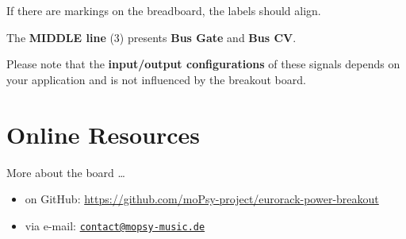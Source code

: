 \documentclass[a4paper,
               11pt,
               parskip=half,
               headinclude,
               titlepage=false]{scrartcl}
\begin{document}
If there are markings on the breadboard, the labels should align.


\vspace{2em}

The \textbf{MIDDLE line} (3) presents \textbf{\color{red}Bus Gate} and \textbf{\color{red}Bus CV}.

Please note that the \textbf{input/output configurations} of these signals depends on your application and is not influenced by the breakout board.


\section*{Online Resources}

More about the board  …
\begin{itemize}[noitemsep]
 \item on GitHub: \url{https://github.com/moPsy-project/eurorack-power-breakout}
 \item via e-mail: \href{mailto:contact@mopsy-music.de}{\texttt{contact@mopsy-music.de}}
\end{itemize}
\end{document}
